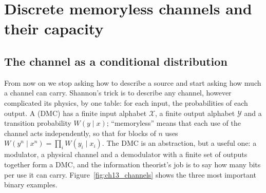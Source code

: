 \par\vspace{0pt plus 10\baselineskip}\vspace{0pt plus -10\baselineskip}
\section{Discrete memoryless channels and their capacity}
\label{sec:ch13:dmc}

\subsection{The channel as a conditional distribution}

From now on we stop asking how to describe a source and start asking how much a channel can
carry. Shannon's trick is to describe any channel, however complicated its physics, by one table:
for each input, the probabilities of each output. A  (DMC) has a
finite input alphabet $\mathcal{X}$, a finite output alphabet $\mathcal{Y}$ and a transition
probability $W(y\mid x)$; ``memoryless'' means that each use of the channel acts independently, so
that for blocks of $n$ uses $W(y^n\mid x^n)=\prod_iW(y_i\mid x_i)$. The DMC is an abstraction, but a
useful one: a modulator, a physical channel and a demodulator with a finite set of outputs together
form a DMC, and the information theorist's job is to say how many bits per use it can carry.
Figure~\ref{fig:ch13_channels} shows the three most important binary examples.

